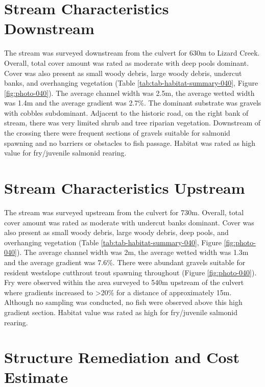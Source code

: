 \documentclass[
]{book}
\begin{document}
\hypertarget{stream-characteristics-downstream-5}{%
\section*{Stream Characteristics Downstream}\label{stream-characteristics-downstream-5}}

The stream was surveyed downstream from the culvert for 630m to Lizard Creek. Overall, total cover amount was rated as moderate with deep pools dominant. Cover was also present as small woody debris, large woody debris, undercut banks, and overhanging vegetation (Table \ref{tab:tab-habitat-summary-040}, Figure \ref{fig:photo-040}). The average channel width was 2.5m, the average wetted width was 1.4m and the average gradient was 2.7\%. The dominant substrate was gravels with cobbles subdominant. Adjacent to the historic road, on the right bank of stream, there was very limited shrub and tree riparian vegetation. Downstream of the crossing there were frequent sections of gravels suitable for salmonid spawning and no barriers or obstacles to fish passage. Habitat was rated as high value for fry/juvenile salmonid rearing.

\hypertarget{stream-characteristics-upstream-5}{%
\section*{Stream Characteristics Upstream}\label{stream-characteristics-upstream-5}}

The stream was surveyed upstream from the culvert for 730m. Overall, total cover amount was rated as moderate with undercut banks dominant. Cover was also present as small woody debris, large woody debris, deep pools, and overhanging vegetation (Table \ref{tab:tab-habitat-summary-040}, Figure \ref{fig:photo-040}). The average channel width was 2m, the average wetted width was 1.3m and the average gradient was 7.6\%. There were abundant gravels suitable for resident westslope cutthrout trout spawning throughout (Figure \ref{fig:photo-040}). Fry were observed within the area surveyed to 540m upstream of the culvert where gradients increased to \textgreater20\% for a distance of approximately 15m. Although no sampling was conducted, no fish were observed above this high gradient section. Habitat value was rated as high for fry/juvenile salmonid rearing.

\hypertarget{structure-remediation-and-cost-estimate-5}{%
\section*{Structure Remediation and Cost Estimate}\label{structure-remediation-and-cost-estimate-5}}
\end{document}
